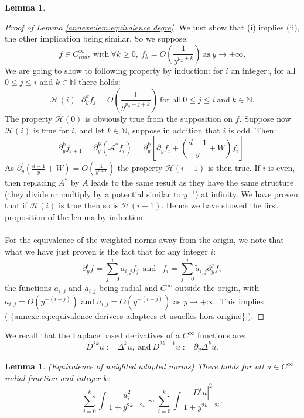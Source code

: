 \documentclass[11pt,a4paper,reqno]{amsart}
\newtheorem{lemma}[theorem]{Lemma}
\theoremstyle{remark}
\numberwithin{equation}{section}
\begin{document}
\begin{appendix}
\begin{lemma}
\end{lemma}

\begin{proof}[Proof of Lemma \ref{annexe:lem:equivalence degre}] We just show that (i) implies (ii), the other implication being similar. So we suppose:
$$
f\in C^{\infty}_{rad}, \ \text{with} \ \forall k\geq 0, \ f_k=O\left( \frac{1}{y^{p_2+k}}\right) \ \text{as} \ y\rightarrow + \infty .
$$
We are going to show to following property by induction: for $i$ an integer:, for all $0\leq j \leq i$ and $k\in\mathbb{N}$ there holds: 
$$
\mathcal{H}(i) \ \ \ \partial_y^k f_j =O\left( \frac{1}{y^{p_2+j+k}}\right)  \ \text{for all} \ 0\leq j \leq i \ \text{and} \ k\in\mathbb{N} .
$$
The property $\mathcal{H}(0)$ is obviously true from the supposition on $f$. Suppose now $\mathcal{H}(i)$ is true for $i$, and let $k\in \mathbb{N}$, suppose in addition that $i$ is odd. Then:
$$
\partial_y^k f_{i+1}=\partial_y^k(\mathcal{A^*}f_i)=\partial_y^k\left[\partial_y f_i+\left(\frac{d-1}{y}+W \right)f_i\right] .
$$
As $\partial_y^l\left(\frac{d-1}{y}+W \right)=O\left( \frac{1}{y^{l+1}}\right) $ the property $\mathcal{H}(i+1)$ is then true. If $i$ is even, then replacing $A^*$ by $A$ leads to the same result as they have the same structure (they divide or multiply by a potential similar to $y^{-1}$) at infinity. We have proven that if $\mathcal{H}(i)$ is true then so is $\mathcal{H}(i+1)$. Hence we have showed the first proposition of the lemma by induction.\\
\\
For the equivalence of the weighted norms away from the origin, we note that what we have just proven is the fact that for any integer $i$:
$$
\partial_y^i f=\sum_{j=0}^{i} a_{i,j}f_j \ \ \text{and } \ \ f_i=\sum_{j=0}^{i} \tilde{a}_{i,j}\partial_y^j f ,
$$
the functions $a_{i,j}$ and $\tilde{a}_{i,j}$ being radial and $C^{\infty}$ outside the origin, with $a_{i,j}=O(y^{-(i-j)})$ and $\tilde{a}_{i,j}=O(y^{-(i-j)})$ as $y\rightarrow +\infty$. This implies {{\rm (\ref{{annexe:eq:equivalence derivees adaptees et usuelles hors origine}})}}.
\end{proof}

We recall that the Laplace based derivatives of a $C^{\infty}$ functions are:
$$
D^{2k}u:=\Delta^k u, \ \text{and} \ D^{2k+1}u:=\partial_y \Delta^{k}u .
$$
\begin{lemma}\label{equivalence of norms}
\emph{(Equivalence of weighted adapted norms)}
There holds for all $u\in C^{\infty}$ radial function and integer $k$:
\begin{equation} \label{annexe:equivalencenormes:eq:equivalences normes}
\sum_{i=0}^k \int \frac{u_i^2}{1+y^{2k-2i}}\sim \sum_{i=0}^k \int \frac{|D^i u|^2}{1+y^{2k-2i}} .
\end{equation}
\end{lemma}


\end{appendix}
\end{document}
